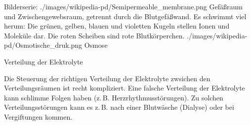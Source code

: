 \begin{PictureSeriesWide}{}{Bilderserie: }
{./images/wikipedia-pd/Semipermeable_membrane.png}
{Gefäßraum und Zwischengewebsraum, getrennt durch die
Blutgefäßwand. Es schwimmt viel herum: Die grünen, gelben,
blauen und violetten Kugeln stellen Ionen und Moleküle dar.
Die roten Scheiben sind rote Blutkörperchen. 
}
{./images/wikipedia-pd/Osmotische_druk.png}
{Osmose }
{}
{}
{}
{}
\end{PictureSeriesWide}

\Text
{Verteilung der Elektrolyte}
{%
Die Steuerung der richtigen Verteilung der
Elektrolyte zwsichen den Verteilungsräumen ist recht
kompliziert.%
% 
Eine
falsche Verteilung der Elektrolyte kann schlimme Folgen
haben (z.\,B. Herzrhythmusstörungen). Zu solchen
Verteilungsstörungen kann es z.\,B. nach einer Blutwäsche
(Dialyse) oder bei Vergiftungen kommen.

}
{}
{}
{}
{}

\begin{Synopsis}
\end{Synopsis}

